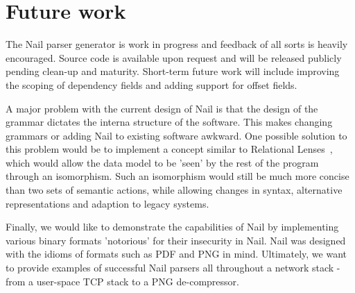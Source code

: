 \section{Future work}
\label{s:future}

The Nail parser generator is work in progress and feedback of all sorts is heavily
encouraged. Source code is available upon request and will be released publicly pending clean-up and
maturity. Short-term future work will include improving the scoping of dependency fields and adding
support for offset fields.

A major problem with the current design of Nail is that the design of the grammar dictates the
interna structure of the software. This makes changing grammars or adding Nail to existing software
awkward. One possible solution to this problem would be to implement a concept similar to Relational
Lenses~\cite{bohannon2006relational}, which would allow  the data model to be 'seen' by
the rest of the program through an isomorphism. Such an isomorphism would still be much more concise
than two sets of semantic actions, while allowing changes in syntax, alternative representations
and adaption to legacy systems.

Finally, we would like to demonstrate the capabilities of Nail by implementing various binary
formats 'notorious' for their insecurity in Nail. Nail was designed with the idioms of formats such
as PDF and PNG in mind. Ultimately, we want to provide examples of successful Nail parsers all
throughout a network stack - from a user-space TCP stack to a PNG de-compressor.

